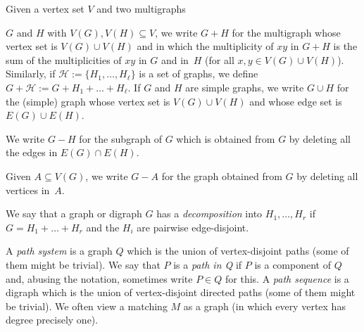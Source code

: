 \documentclass{memo-l}
\def\COMMENT#1{}
\numberwithin{section}{chapter}
\numberwithin{equation}{section}
\numberwithin{firstthm}{section}
\numberwithin{figure}{section}
\begin{document}
Given a vertex set $V$ and two multigraphs%
   \COMMENT{Have to define this for multigraphs instead of graph since if we take $G+H+F$ then $G+H$ might already be a multigraph.}
$G$ and $H$ with $V(G),V(H)\subseteq V$, we write $G+H$ for the multigraph whose vertex
set is $V(G)\cup V(H)$ and in which the multiplicity of $xy$ in $G+H$ is the sum of the multiplicities of $xy$ in $G$ and in~$H$
(for all $x,y\in V(G)\cup V(H)$). Similarly, if $\mathcal{H}:=\{H_1,\dots,H_\ell\}$ is a set of graphs, we define
$G+\mathcal{H}:=G+H_1+\dots+H_\ell$.
If $G$ and $H$ are simple graphs, we write $G\cup H$ for the (simple) graph whose vertex set is
$V(G)\cup V(H)$ and whose edge set is $E(G)\cup E(H)$.%
   \COMMENT{I think this is a good convention. It has the advantage that if we talk about
$G+J^*$ then it is clear that we treat the edges in $J^*$ as being distinct from those in $G$. However, this means that we cannot
talk about $G+EPS^*$ (we would need to write $G+{\rm Fict}(EPS^*)$ instead). Have to make sure that this fits with the almost decomposition section/paper.}
We write $G-H$ for the subgraph of $G$ which is obtained from $G$
by deleting all the edges in $E(G)\cap E(H)$.%
    \COMMENT{So we don't require that $H\subseteq G$ when using this notation.} 
Given $A\subseteq V(G)$, we write $G-A$ for the graph obtained from $G$ by deleting all vertices in~$A$.

We say that a graph or digraph $G$ has a \emph{decomposition} into $H_1,\dots,H_r$ if $G=H_1+\dots +H_r$ and the $H_i$ are pairwise edge-disjoint.

A \emph{path system} is a graph $Q$ which is the union of vertex-disjoint paths (some of them might be trivial).
We say that $P$ is a \emph{path in Q} if $P$ is a component of $Q$ and, abusing the notation, sometimes write $P\in Q$ for this.
A \emph{path sequence} is a digraph which is the union of vertex-disjoint directed paths (some of them might be trivial).
We often view a matching $M$ as a graph (in which every vertex has degree precisely one).%
    \COMMENT{This is different to eg the bipartite paper where a matching us a set of edges. CHECK whether we always use this
def in this paper, ie whether we write $e(M)$ for the number of edges and not $|M|$.}
\end{document}
